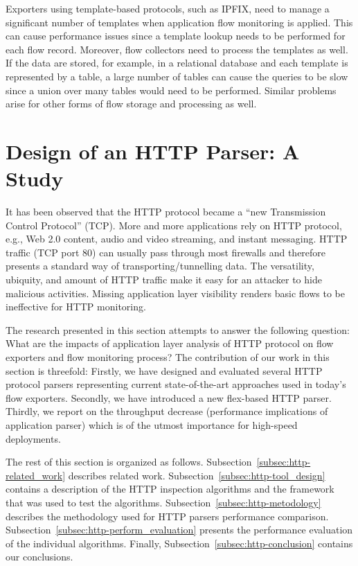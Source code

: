 Exporters using template-based protocols, such as IPFIX, need to manage a significant number of templates when application flow monitoring is applied. This can cause performance issues since a template lookup needs to be performed for each flow record. Moreover, flow collectors need to process the templates as well. If the data are stored, for example, in a relational database and each template is represented by a table, a large number of tables can cause the queries to be slow since a union over many tables would need to be performed. Similar problems arise for other forms of flow storage and processing as well.


\section{Design of an HTTP Parser: A Study}\label{sec:http-parser-design}

It has been observed that the HTTP protocol became a ``new Transmission Control Protocol'' (TCP). More and more applications rely on HTTP protocol, e.g., Web 2.0 content, audio and video streaming, and instant messaging. HTTP traffic (TCP port 80) can usually pass through most firewalls and therefore presents a standard way of transporting/tunnelling data. The versatility, ubiquity, and amount of HTTP traffic make it easy for an attacker to hide malicious activities. Missing application layer visibility renders basic flows to be ineffective for HTTP monitoring.

The research presented in this section attempts to answer the following question: What are the impacts of application layer analysis of HTTP protocol on flow exporters and flow monitoring process? The contribution of our work in this section is threefold: Firstly, we have designed and evaluated several HTTP protocol parsers representing current state-of-the-art approaches used in today's flow exporters. Secondly, we have introduced a new flex-based HTTP parser. Thirdly, we report on the throughput decrease (performance implications of application parser) which is of the utmost importance for high-speed deployments.

The rest of this section is organized as follows. Subsection~\ref{subsec:http-related_work} describes related work. Subsection~\ref{subsec:http-tool_design} contains a description of the HTTP inspection algorithms and the framework that was used to test the algorithms. Subsection~\ref{subsec:http-metodology} describes the methodology used for HTTP parsers performance comparison. Subsection~\ref{subsec:http-perform_evaluation} presents the performance evaluation of the individual algorithms. Finally, Subsection~\ref{subsec:http-conclusion} contains our conclusions.

